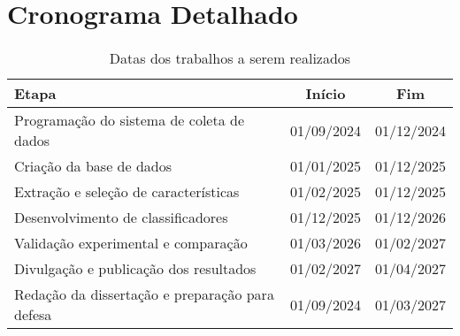 	\section{Cronograma Detalhado}
	
	\begin{table}[h!]
		\centering
		\caption{Datas dos trabalhos a serem realizados}
		\begin{tabular}{|p{10cm}|c|c|}
			\hline
			\textbf{Etapa} & \textbf{Início} & \textbf{Fim} \\
			\hline
			Programação do sistema de coleta de dados & 01/09/2024 & 01/12/2024 \\
			\hline
			Criação da base de dados & 01/01/2025 & 01/12/2025 \\
			\hline
			Extração e seleção de características & 01/02/2025 & 01/12/2025 \\
			\hline
			Desenvolvimento de classificadores & 01/12/2025 & 01/12/2026 \\
			\hline
			Validação experimental e comparação & 01/03/2026 & 01/02/2027 \\
			\hline
			Divulgação e publicação dos resultados & 01/02/2027 & 01/04/2027 \\
			\hline
			Redação da dissertação e preparação para defesa & 01/09/2024 & 01/03/2027 \\
			\hline
		\end{tabular}
		\label{tab:cronograma}
	\end{table}
	
